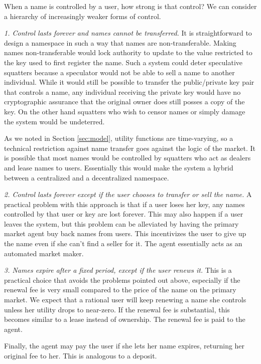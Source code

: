 When a name is controlled by a user, how strong is that control? We can consider a hierarchy of increasingly weaker forms of control.

{\em 1. Control lasts forever and names cannot be transferred.} It is straightforward to design a namespace in such a way that names are non-transferable. Making names non-transferable would lock authority to update to the value restricted to the key used to first register the name. Such a system could deter speculative squatters because a speculator would not be able to sell a name to another individual. While it would still be possible to transfer the public/private key pair that controls a name, any individual receiving the private key would have no cryptographic assurance that the original owner does still posses a copy of the key. On the other hand squatters who wish to censor names or simply damage the system would be undeterred.

As we noted in Section \ref{sec:model}, utility functions are time-varying, so a technical restriction against name transfer goes against the logic of the market. It is possible that most names would be controlled by squatters who act as dealers and lease names to users. Essentially this would make the system a hybrid between a centralized and a decentralized namespace.


{\em 2. Control lasts forever except if the user chooses to transfer or sell the name.} A practical problem with this approach is that if a user loses her key, any names controlled by that user or key are lost forever. This may also happen if a user leaves the system, but this problem can be alleviated by having the primary market agent buy back names from users. This incentivizes the user to give up the name even if she can't find a seller for it. The agent essentially acts as an automated market maker.

{\em 3. Names expire after a fixed period, except if the user renews it.} This is a practical choice that avoids the problems pointed out above, especially if the renewal fee is very small compared to the price of the name on the primary market. 
We expect that a rational user will keep renewing a name she controls unless her utility drops to near-zero.
If the renewal fee is substantial, this becomes similar to a lease instead of ownership. The renewal fee is paid to the agent. 

Finally, the agent may pay the user if she lets her name expires, returning her original fee to her. This is analogous to a deposit.

